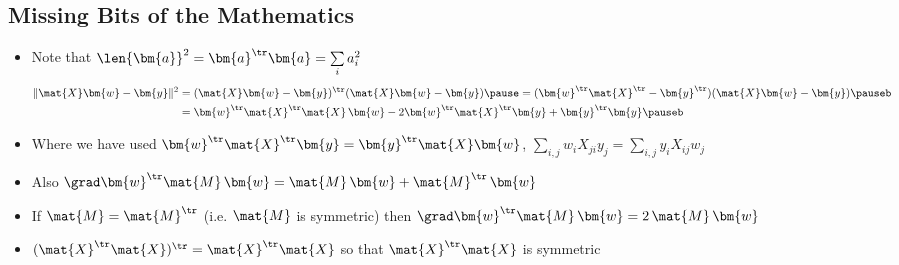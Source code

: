 \begin{slide}
\section[-1]{Missing Bits of the Mathematics}

\begin{PauseHighLight}
  \begin{itemize}
  \item Note that $\len{\bm{a}}^2 = \bm{a}^\tr \bm{a} = \sum\limits_i a_i^2$\pause
    \begin{align*}
      \| \mat{X} \bm{w} - \bm{y}\|^2 &= (\mat{X} \bm{w} -
      \bm{y})^\tr(\mat{X} \bm{w} - \bm{y})\pause = (\bm{w}^\tr \mat{X}
                                       ^\tr - \bm{y}^\tr)(\mat{X}
                                       \bm{w} - \bm{y})\pauseb\\
      &=\bm{w}^\tr
      \mat{X}^\tr\mat{X} \, \bm{w} -  2 \bm{w}^\tr\mat{X}^\tr \bm{y} +
      \bm{y}^\tr  \bm{y}\pauseb
    \end{align*}
  \item Where we have used $\bm{w}^\tr\mat{X}^\tr \bm{y} =
    \bm{y}^\tr\mat{X} \bm{w}$\pause{}, $\sum\limits_{i,j} w_i X_{ji} y_j
    = \sum\limits_{i,j} y_i X_{ij} w_j$\pauseb
  \item Also $\grad \bm{w}^\tr \mat{M}\, \bm{w} = \mat{M}\,\bm{w} + \mat{M}^\tr\, \bm{w}$\pause
  \item If $\mat{M}=\mat{M}^\tr$ (i.e.{} $\mat{M}$ is symmetric) then
    $\grad \bm{w}^\tr \mat{M}\, \bm{w} = 2\,\mat{M}\,\bm{w}$\pause
  \item $(\mat{X}^\tr\mat{X})^\tr = \mat{X}^\tr\mat{X}$ so that
    $\mat{X}^\tr\mat{X}$ is symmetric\pause
  \end{itemize}
\end{PauseHighLight}

\end{slide}


